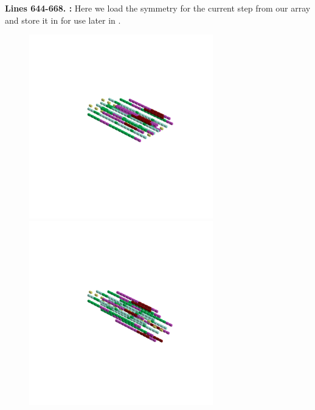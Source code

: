 \textbf{Lines 644-668. :} Here we load the symmetry for the current step from our array and store it in
 for use later in .

\clearpage
\hspace{-1cm}
\begin{minipage}[b]{0.50\linewidth}                                       
  \begin{figure}[H]
      \centering
        \vspace*{-1cm}
        \hspace*{-2cm}
        \includegraphics[width=8cm]{src/symmetries/pattern10_1-45.png}%
        \hspace*{-4cm}
        \includegraphics[width=8cm]{src/symmetries/pattern10_2-45.png}\\
        \vspace*{-5cm}
        \hspace*{-3cm}

\end{figure}
\end{minipage}
